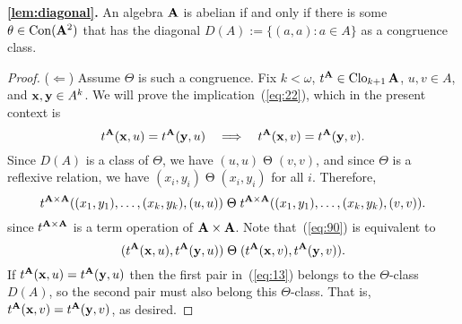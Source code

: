 \begin{lem}{\bf\ref{lem:diagonal}.}
 An algebra $\mathbf{A}$ is abelian if and only if there is some 
 $\theta \in \operatorname{Con} (\mathbf{A}^2)$ that has the diagonal $D(A):= \{(a,a): a \in A\}$ 
 as a congruence class.
\end{lem}
\begin{proof}
($\Leftarrow$) Assume $\Theta$ is such a congruence.  Fix 
  $k<\omega$,
  $t^{\mathbf{A}}\in \operatorname{Clo}_{k+1}\mathbf{A}$, 
  $u, v \in A$, and
  $\mathbf{x}, \mathbf{y} \in A^k$.
  We will prove the implication~(\ref{eq:22}), which in the present context is
\begin{equation*}
t^{\mathbf{A}}(\mathbf{x},u) = t^{\mathbf{A}}(\mathbf{y},u) \quad \Longrightarrow \quad 
t^{\mathbf{A}}(\mathbf{x},v) = t^{\mathbf{A}}(\mathbf{y},v).
\end{equation*}
Since $D(A)$ is a class of $\Theta$, we have 
  $(u,u) \mathrel{\Theta} (v,v)$, and since $\Theta$ is a reflexive relation, we have
  $(x_i,y_i)  \mathrel{\Theta} (x_i,y_i)$ for all $i$.  Therefore,
\begin{equation}
  \label{eq:90}  
  t^{\mathbf{A}\times \mathbf{A}}((x_1,y_1), \dots, (x_k,y_k), (u,u))
  \mathrel{\Theta}
  t^{\mathbf{A}\times \mathbf{A}}((x_1,y_1), \dots, (x_k,y_k), (v,v)).
\end{equation}
  since $t^{\mathbf{A} \times \mathbf{A}}$ is a term operation of $\mathbf{A}\times \mathbf{A}$.
  Note that~(\ref{eq:90}) is equivalent to
  \begin{equation}
    \label{eq:13}
    (t^{\mathbf{A}}(\mathbf{x}, u), t^{\mathbf{A}}(\mathbf{y},u))
    \mathrel{\Theta}
    (t^{\mathbf{A}}(\mathbf{x}, v), t^{\mathbf{A}}(\mathbf{y}, v)).
  \end{equation}
  If $t^{\mathbf{A}}(\mathbf{x}, u)= t^{\mathbf{A}}(\mathbf{y}, u)$ then 
  the first pair in~(\ref{eq:13}) belongs to the $\Theta$-class
  $D(A)$, so the second pair must also belong this $\Theta$-class.
  That is, $t^{\mathbf{A}}(\mathbf{x}, v)= t^{\mathbf{A}}(\mathbf{y}, v)$, as desired.

  \vskip2mm


\end{proof}
